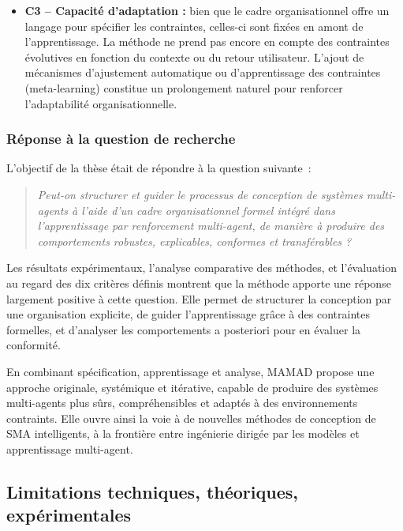 \begin{itemize}
    \item \textbf{C3 – Capacité d’adaptation :} bien que le cadre organisationnel offre un langage pour spécifier les contraintes, celles-ci sont fixées en amont de l’apprentissage. La méthode ne prend pas encore en compte des contraintes évolutives en fonction du contexte ou du retour utilisateur. L’ajout de mécanismes d’ajustement automatique ou d’apprentissage des contraintes (meta-learning) constitue un prolongement naturel pour renforcer l’adaptabilité organisationnelle.
\end{itemize}


\subsubsection*{Réponse à la question de recherche}

\noindent
L’objectif de la thèse était de répondre à la question suivante~:

\begin{quote}
    \emph{Peut-on structurer et guider le processus de conception de systèmes multi-agents à l’aide d’un cadre organisationnel formel intégré dans l’apprentissage par renforcement multi-agent, de manière à produire des comportements robustes, explicables, conformes et transférables ?}
\end{quote}

\noindent
Les résultats expérimentaux, l’analyse comparative des méthodes, et l’évaluation au regard des dix critères définis montrent que la méthode  apporte une réponse largement positive à cette question. Elle permet de structurer la conception par une organisation explicite, de guider l’apprentissage grâce à des contraintes formelles, et d’analyser les comportements a posteriori pour en évaluer la conformité.

En combinant spécification, apprentissage et analyse, MAMAD propose une approche originale, systémique et itérative, capable de produire des systèmes multi-agents plus sûrs, compréhensibles et adaptés à des environnements contraints. Elle ouvre ainsi la voie à de nouvelles méthodes de conception de SMA intelligents, à la frontière entre ingénierie dirigée par les modèles et apprentissage multi-agent.

\subsection{Limitations techniques, théoriques, expérimentales}
\label{sec:limitations}

